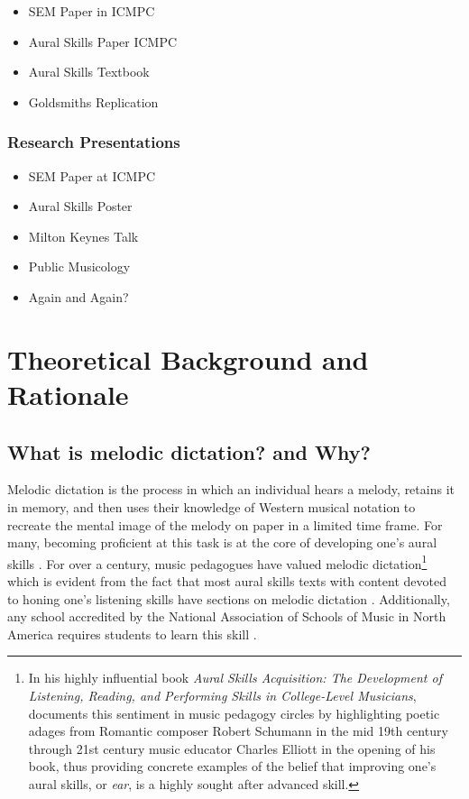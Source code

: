 \documentclass[]{book}
\providecommand{\tightlist}{%
  \setlength{\itemsep}{0pt}\setlength{\parskip}{0pt}}
\let\rmarkdownfootnote\footnote%
\def\footnote{\protect\rmarkdownfootnote}
\begin{document}
\begin{itemize}
\tightlist
\item
  SEM Paper in ICMPC
\item
  Aural Skills Paper ICMPC
\item
  Aural Skills Textbook
\item
  Goldsmiths Replication
\end{itemize}

\hypertarget{research-presentations}{%
\subsection{Research Presentations}\label{research-presentations}}

\begin{itemize}
\tightlist
\item
  SEM Paper at ICMPC
\item
  Aural Skills Poster
\item
  Milton Keynes Talk
\item
  Public Musicology
\item
  Again and Again?
\end{itemize}

\hypertarget{intro}{%
\chapter{Theoretical Background and Rationale}\label{intro}}

\hypertarget{what-is-melodic-dictation-and-why}{%
\section{What is melodic dictation? and Why?}\label{what-is-melodic-dictation-and-why}}

Melodic dictation is the process in which an individual hears a melody, retains it in memory, and then uses their knowledge of Western musical notation to recreate the mental image of the melody on paper in a limited time frame.
For many, becoming proficient at this task is at the core of developing one's aural skills \citep{karpinskiModelMusicPerception1990}.
For over a century, music pedagogues have valued melodic dictation\footnote{In his highly influential book \emph{Aural Skills Acquisition: The Development of Listening, Reading, and Performing Skills in College-Level Musicians}, \citet{karpinskiAuralSkillsAcquisition2000} documents this sentiment in music pedagogy circles by highlighting poetic adages from Romantic composer Robert Schumann in the mid 19th century through 21st century music educator Charles Elliott in the opening of his book, thus providing concrete examples of the belief that improving one's aural skills, or \emph{ear}, is a highly sought after advanced skill.} which is evident from the fact that most aural skills texts with content devoted to honing one's listening skills have sections on melodic dictation \citep{karpinskiAuralSkillsAcquisition2000}.
Additionally, any school accredited by the National Association of Schools of Music in North America requires students to learn this skill \citep[ §VIII.6.B.2.A]{NationalAssociationSchools2018}.
\end{document}
